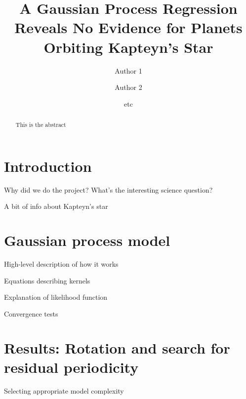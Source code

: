 \documentclass{aastex6}
\begin{document}
\pagestyle{plain}

\title{A Gaussian Process Regression Reveals No Evidence for Planets
Orbiting Kapteyn's Star}

\author{Author 1}
\author{Author 2}
\author{etc}



\begin{abstract}

This is the abstract

\end{abstract}


\maketitle

\section{Introduction}

Why did we do the project? What's the interesting science
question?

A bit of info about Kapteyn's star

\section{Gaussian process model}

High-level description of how it works

Equations describing kernels

Explanation of likelihood function

Convergence tests

\section{Results: Rotation and search for residual periodicity}

Selecting appropriate model complexity
\end{document}
